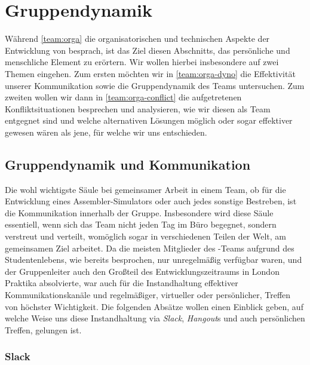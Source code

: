 
\section{Gruppendynamik}
\label{team:group}

Während \autoref{team:orga} die organisatorischen und technischen Aspekte
der Entwicklung von \erasim{} besprach, ist das Ziel diesen Abschnitts, das
persönliche und menschliche Element zu erörtern. Wir wollen hierbei insbesondere
auf zwei Themen eingehen. Zum ersten möchten wir in \autoref{team:orga-dyno}
die Effektivität unserer Kommunikation sowie die Gruppendynamik des Teams
untersuchen. Zum zweiten wollen wir dann in \autoref{team:orga-conflict} die
aufgetretenen Konfliktsituationen besprechen und analysieren, wie wir diesen als
Team entgegnet sind und welche alternativen Lösungen möglich oder sogar
effektiver gewesen wären als jene, für welche wir uns entschieden.

\subsection{Gruppendynamik und Kommunikation}
\label{team:orga-dyno}

Die wohl wichtigste Säule bei gemeinsamer Arbeit in einem Team, ob für die
Entwicklung eines Assembler-Simulators oder auch jedes sonstige Bestreben, ist
die Kommunikation innerhalb der Gruppe. Insbesondere wird diese Säule
essentiell, wenn sich das Team nicht jeden Tag im Büro begegnet, sondern
verstreut und verteilt, womöglich sogar in verschiedenen Teilen der Welt, am
gemeinsamen Ziel arbeitet. Da die meisten Mitglieder des \erasim{}-Teams
aufgrund des Studentenlebens, wie bereits besprochen, nur unregelmäßig verfügbar
waren, und der Gruppenleiter auch den Großteil des Entwicklungszeitraums in
London Praktika absolvierte, war auch für \erasim{} die Instandhaltung
effektiver Kommunikationskanäle und regelmäßiger, virtueller oder persönlicher,
Treffen von höchster Wichtigkeit. Die folgenden Absätze wollen einen Einblick
geben, auf welche Weise uns diese Instandhaltung via \emph{Slack},
\emph{Hangout}s und auch persönlichen Treffen, gelungen ist.

\subsubsection{Slack}
\label{team:orga-dyno-slack}

